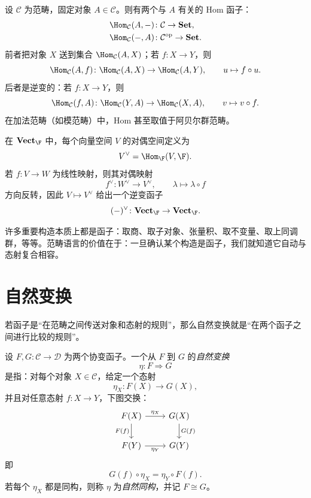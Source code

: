 \begin{example}[Hom 函子]
设 $\mathcal C$ 为范畴，固定对象 $A\in \mathcal C$。则有两个与 $A$ 有关的 Hom 函子：
\begin{align*}
  \Hom_{\mathcal C}(A,-)&\colon \mathcal C\to \mathbf{Set},\\
  \Hom_{\mathcal C}(-,A)&\colon \mathcal C^{\mathrm{op}}\to \mathbf{Set}.
\end{align*}
前者把对象 $X$ 送到集合 $\Hom_{\mathcal C}(A,X)$；若 $f\colon X\to Y$，则
\[
  \Hom_{\mathcal C}(A,f)\colon \Hom_{\mathcal C}(A,X)\to \Hom_{\mathcal C}(A,Y),
  \qquad u\mapsto f\circ u.
\]
后者是逆变的：若 $f\colon X\to Y$，则
\[
  \Hom_{\mathcal C}(f,A)\colon \Hom_{\mathcal C}(Y,A)\to \Hom_{\mathcal C}(X,A),
  \qquad v\mapsto v\circ f.
\]
在加法范畴（如模范畴）中，Hom 甚至取值于阿贝尔群范畴。
\end{example}

\begin{example}[对偶函子]
在 $\mathbf{Vect}_{\F}$ 中，每个向量空间 $V$ 的对偶空间定义为
\[
  V^{\vee}=\Hom_{\F}(V,\F).
\]
若 $f\colon V\to W$ 为线性映射，则其对偶映射
\[
  f^{\vee}\colon W^{\vee}\to V^{\vee},
  \qquad \lambda\mapsto \lambda\circ f
\]
方向反转，因此 $V\mapsto V^{\vee}$ 给出一个逆变函子
\[
  (-)^{\vee}\colon \mathbf{Vect}_{\F}\to \mathbf{Vect}_{\F}.
\]
\end{example}

\begin{remark}
许多重要构造本质上都是函子：取商、取子对象、张量积、取不变量、取上同调群，等等。范畴语言的价值在于：一旦确认某个构造是函子，我们就知道它自动与态射复合相容。
\end{remark}

\section{自然变换}

若函子是“在范畴之间传送对象和态射的规则”，那么自然变换就是“在两个函子之间进行比较的规则”。

\begin{definition}
设 $F,G\colon \mathcal C\to \mathcal D$ 为两个协变函子。一个从 $F$ 到 $G$ 的\emph{自然变换}
\[
  \eta\colon F\Rightarrow G
\]
是指：对每个对象 $X\in \mathcal C$，给定一个态射
\[
  \eta_X\colon F(X)\to G(X),
\]
并且对任意态射 $f\colon X\to Y$，下图交换：
\[
\begin{tikzcd}
F(X) \arrow[r,"{\eta_X}"] \arrow[d,"{F(f)}"'] & G(X) \arrow[d,"{G(f)}"] \\
F(Y) \arrow[r,"{\eta_Y}"'] & G(Y)
\end{tikzcd}
\]
即
\[
  G(f)\circ \eta_X = \eta_Y\circ F(f).
\]
若每个 $\eta_X$ 都是同构，则称 $\eta$ 为\emph{自然同构}，并记 $F\cong G$。
\end{definition}


